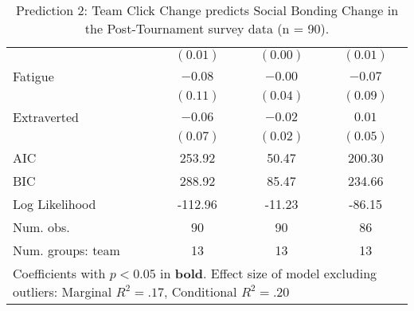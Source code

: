 \begin{table}
\begin{center}
\begin{tabular}{l c c c }
                                           & $(0.01)$             & $(0.00)$              & $(0.01)$              \\
Fatigue                                    & $-0.08$              & $-0.00$               & $-0.07$               \\
                                           & $(0.11)$             & $(0.04)$              & $(0.09)$              \\
Extraverted                                & $-0.06$              & $-0.02$               & $0.01$                \\
                                           & $(0.07)$             & $(0.02)$              & $(0.05)$              \\
\midrule
AIC                                        & 253.92               & 50.47                 & 200.30                \\
BIC                                        & 288.92               & 85.47                 & 234.66                \\
Log Likelihood                             & -112.96              & -11.23                & -86.15                \\
Num. obs.                                  & 90                   & 90                    & 86                    \\
Num. groups: team                          & 13                   & 13                    & 13                    \\

\bottomrule
\multicolumn{4}{l}{\scriptsize{Coefficients with $p < 0.05$ in \textbf{bold}. Effect size of model excluding outliers: Marginal $R^2 = .17$, Conditional $R^2 = .20$}}
\end{tabular}
\caption{Prediction 2: Team Click Change predicts Social Bonding Change in the Post-Tournament survey data (n = 90).}
\label{tab:MLM21bOutLogComparison}
\end{center}
\end{table}
